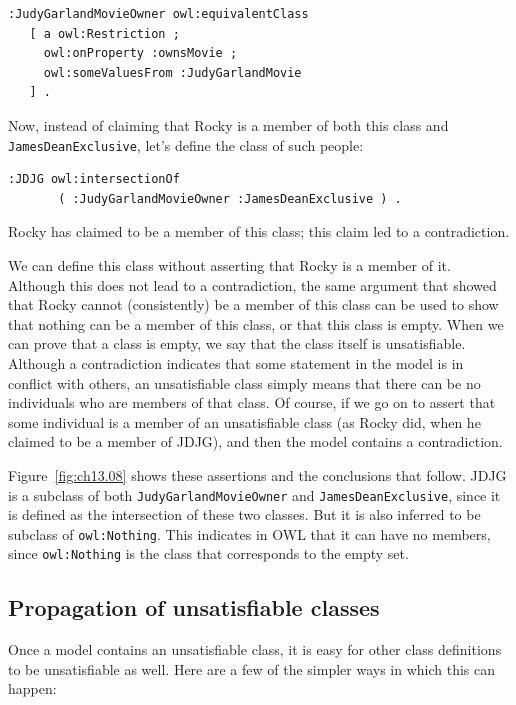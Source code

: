 \begin{lstlisting}
:JudyGarlandMovieOwner owl:equivalentClass
   [ a owl:Restriction ;
     owl:onProperty :ownsMovie ;
     owl:someValuesFrom :JudyGarlandMovie
   ] .
\end{lstlisting}

Now, instead of claiming that Rocky is a member of both this class and
\texttt{JamesDeanExclusive}, let's define the class of such people:

\begin{lstlisting}
:JDJG owl:intersectionOf
       ( :JudyGarlandMovieOwner :JamesDeanExclusive ) .
\end{lstlisting}

Rocky has claimed to be a member of this class; this claim led to a
contradiction.

We can define this class without asserting that Rocky is a member of it.
Although this does not lead to a contradiction, the same argument that
showed that Rocky cannot (consistently) be a member of this class can be
used to show that nothing can be a member of this class, or that this
class is empty. When we can prove that a class is empty, we say that the
class itself is unsatisfiable. Although a contradiction indicates that
some statement in the model is in conflict with others, an unsatisfiable
class simply means that there can be no individuals who are members of
that class. Of course, if we go on to assert that some individual is a
member of an unsatisfiable class (as Rocky did, when he claimed to be a
member of JDJG), and then the model contains a contradiction.

Figure~\ref{fig:ch13.08} shows these assertions and the conclusions that follow. JDJG
is a subclass of both
\texttt{JudyGarlandMovieOwner} and \texttt{JamesDeanExclusive}, since it is defined as the
intersection of these two classes. But it is also inferred to be
subclass of \texttt{owl:Nothing}. This indicates in OWL that it can have no
members, since \texttt{owl:Nothing} is the class that corresponds to the empty
set.

\subsection{Propagation of unsatisfiable classes}

Once a model contains an unsatisfiable class, it is easy for other class
definitions to be unsatisfiable as well. Here are a few of the simpler
ways in which this can happen:

